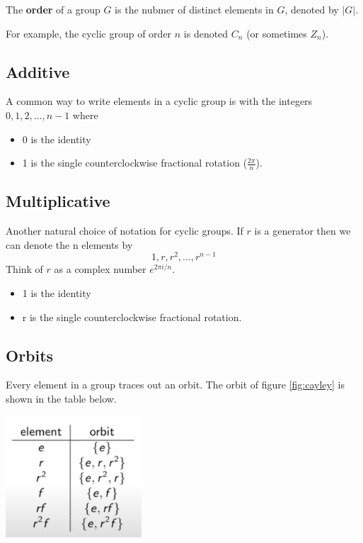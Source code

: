 \documentclass[twocolumn]{article}
\begin{document}
\begin{tcolorbox}[colback=blue!5!white,colframe=blue!15!white,coltitle=black, boxrule=0pt,title=Definition, drop shadow southeast, enhanced]
    The \textbf{order} of a group $G$ is the nubmer of distinct elements in $G$, denoted by $|G|$.
\end{tcolorbox}
For example, the cyclic group of order $n$ is denoted $C_n$ (or sometimes $Z_n$).

\subsection{Additive}

A common way to write elements in a cyclic group is with the integers $0,1,2,\dots,n-1$ where
\begin{itemize}
    \item 0 is the identity 
    \item 1 is the single counterclockwise fractional rotation ($\frac{2\pi}{n}$).
\end{itemize}

\subsection{Multiplicative}

Another natural choice of notation for cyclic groups. If $r$ is a generator then we can denote the n elements by 
\begin{equation}
    1,r, r^2,\dots,r^{n-1}
\end{equation}
Think of $r$ as a complex number $e^{2\pi i/n}$.
\begin{itemize}
    \item 1 is the identity
    \item r is the single counterclockwise fractional rotation.
\end{itemize}

\subsection{Orbits}

Every element in a group traces out an orbit. The orbit of figure \ref{fig:cayley} is shown in the table below.
\begin{table}[h]
    \centering
    \includegraphics[width=2in]{figure/orbit.png}
\end{table}
\end{document}
